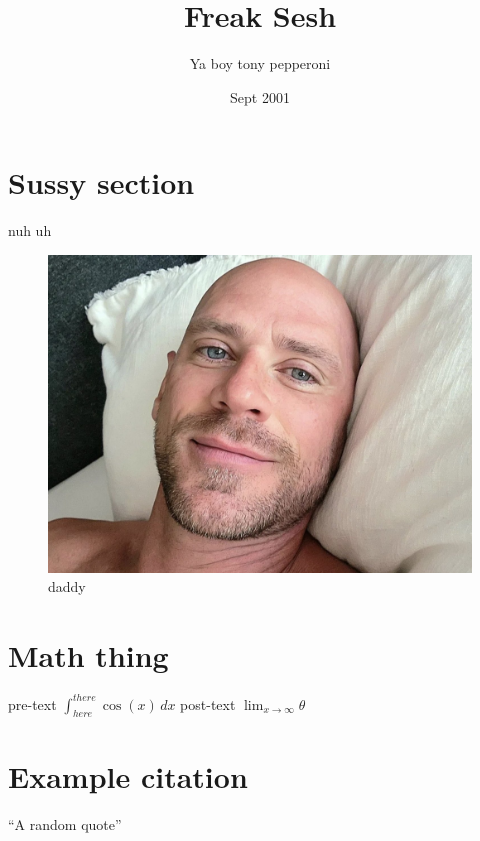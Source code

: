\documentclass{article}
\title{Freak Sesh}
\author{Ya boy tony pepperoni}
\date{Sept 2001}
\begin{document}
    \maketitle

    \section{Sussy section}
        nuh uh

        \begin{figure}[h!]
            \centering
            \includegraphics[scale=.2]{johnny}
            \caption{daddy}
            \label{fig:johnny}
        \end{figure}

    \section{Math thing}
        pre-text \(\int_{here}^{there} \cos(x) \,dx\) post-text
        \bigbreak
        \(\lim_{x \to \infty}\theta \)

    \section{Example citation}
        ``A random quote'' \citep{exampleBook}

    
    
\end{document}
